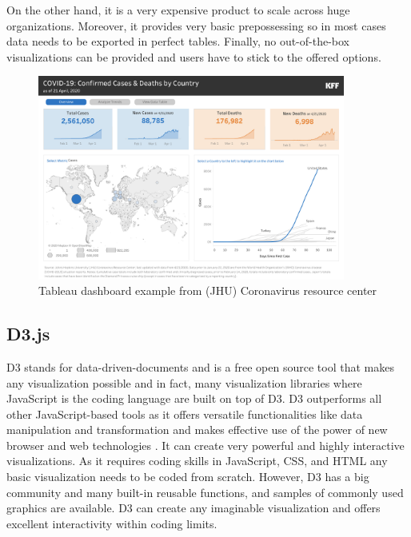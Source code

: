 On the other hand, it is a very expensive product to scale across huge organizations. Moreover, it provides very basic prepossessing so in most cases data needs to be exported in perfect tables. Finally, no out-of-the-box visualizations can be provided and users have to stick to the offered options.


\begin{figure}[H]
\centering
\captionsetup{justification=centering}
\includegraphics[width=0.9\textwidth]{Report-latex/tex_files/pics/tableau.png}
\caption{Tableau dashboard example from (JHU) Coronavirus resource center \cite{kff}}
\label{fig:tableau}
\end{figure}



\subsection{D3.js}

D3 stands for data-driven-documents \cite{2011-d3} and is a free open source tool that makes any visualization possible and in fact, many visualization libraries where JavaScript is the coding language are built on top of D3. D3 outperforms all other JavaScript-based tools as it offers versatile functionalities like data manipulation and transformation and makes effective use of the power of new browser and web technologies \cite{nair2016interactive}. It can create very powerful and highly interactive visualizations. As it requires coding skills in JavaScript, CSS, and HTML any basic visualization needs to be coded from scratch. However, D3 has a big community and many built-in reusable functions, and samples of commonly used graphics are available. D3 can create any imaginable visualization and offers excellent interactivity within coding limits. 

